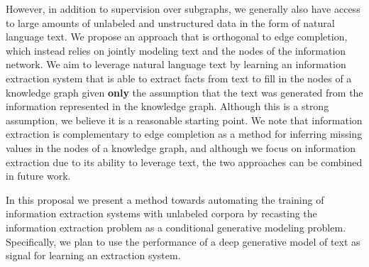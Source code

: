 \documentclass[12pt]{article}
\begin{document}
However, in addition to supervision over subgraphs, 
we generally also have access to large amounts of unlabeled and unstructured data
in the form of natural language text.
We propose an approach that is orthogonal to edge completion,
which instead relies on jointly modeling
text and the nodes of the information network.
We aim to leverage natural language text by
learning an information extraction system that is able to 
extract facts from text to fill in the nodes of a knowledge graph
given \textbf{only} the assumption that the text was generated from the information
represented in the knowledge graph.
Although this is a strong assumption, we believe it is a reasonable starting point.
We note that information extraction is complementary to edge completion as a method
for inferring missing values in the nodes of a knowledge graph,
and although we focus on information extraction due to its ability to leverage text, 
the two approaches can be combined in future work.

In this proposal we present a method towards automating the
training of information extraction systems with unlabeled corpora
by recasting the information extraction problem as a conditional generative modeling problem.
Specifically, we plan to use the performance of a deep generative model of text 
as signal for learning an extraction system.

\begin{comment}
(Include exemplar knowledge graph diagram, and show that we focus on filling nodes paired with text)
(Diagram highlighting the difference between modeling edges without text for KG completion
vs only modeling nodes jointly with text. Highlight complementary nature and emphasize
combination as future work)
\end{comment}
\end{document}
